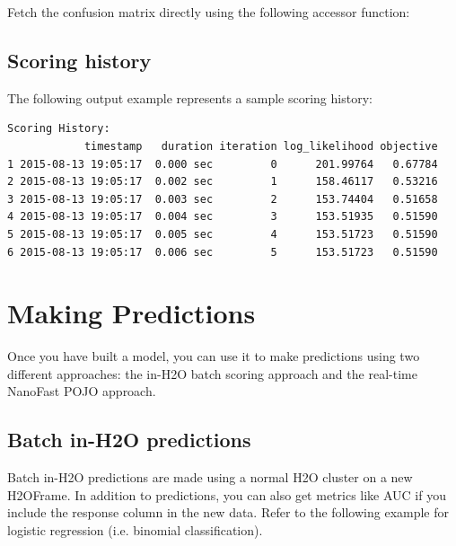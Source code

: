 Fetch the confusion matrix directly using the following accessor function:



\subsection{Scoring history}

The following output example represents a sample scoring history: 


\begin{lstlisting}[style=output]
Scoring History:
            timestamp   duration iteration log_likelihood objective
1 2015-08-13 19:05:17  0.000 sec         0      201.99764   0.67784
2 2015-08-13 19:05:17  0.002 sec         1      158.46117   0.53216
3 2015-08-13 19:05:17  0.003 sec         2      153.74404   0.51658
4 2015-08-13 19:05:17  0.004 sec         3      153.51935   0.51590
5 2015-08-13 19:05:17  0.005 sec         4      153.51723   0.51590
6 2015-08-13 19:05:17  0.006 sec         5      153.51723   0.51590
\end{lstlisting}


\section{Making Predictions}

Once you have built a model, you can use it to make predictions using two different approaches:  the in-H2O batch
scoring approach and the real-time NanoFast POJO approach.

\subsection{Batch in-H2O predictions}

Batch in-H2O predictions are made using a normal H2O cluster on a new H2OFrame.  In addition to predictions, you
can also get metrics like AUC if you include the response column in the new data.  Refer to the following example for logistic regression (i.e. binomial classification).

\bigskip
\waterExampleInR



